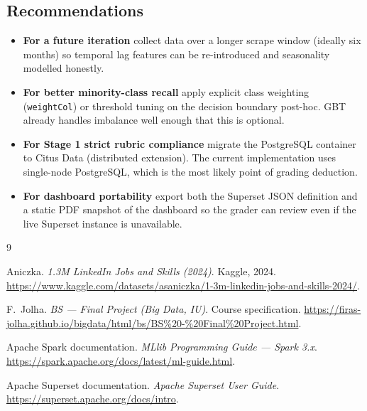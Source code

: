 \documentclass[11pt,a4paper]{article}
\begin{document}
\subsection{Recommendations}
\begin{itemize}[leftmargin=*]
  \item \textbf{For a future iteration} collect data over a longer
    scrape window (ideally six months) so temporal lag features can
    be re-introduced and seasonality modelled honestly.
  \item \textbf{For better minority-class recall} apply explicit
    class weighting (\texttt{weightCol}) or threshold tuning on the
    decision boundary post-hoc.  GBT already handles imbalance well
    enough that this is optional.
  \item \textbf{For Stage 1 strict rubric compliance} migrate the
    PostgreSQL container to Citus Data (distributed extension).  The
    current implementation uses single-node PostgreSQL, which is the
    most likely point of grading deduction.
  \item \textbf{For dashboard portability} export both the Superset
    JSON definition and a static PDF snapshot of the dashboard so the
    grader can review even if the live Superset instance is
    unavailable.
\end{itemize}

\begin{thebibliography}{9}

Aniczka.
\emph{1.3M LinkedIn Jobs and Skills (2024)}.
Kaggle, 2024. \url{https://www.kaggle.com/datasets/asaniczka/1-3m-linkedin-jobs-and-skills-2024/}.

F.\ Jolha.
\emph{BS --- Final Project (Big Data, IU)}.
Course specification.
\url{https://firas-jolha.github.io/bigdata/html/bs/BS\%20-\%20Final\%20Project.html}.

Apache Spark documentation.
\emph{MLlib Programming Guide --- Spark 3.x}.
\url{https://spark.apache.org/docs/latest/ml-guide.html}.

Apache Superset documentation.
\emph{Apache Superset User Guide}.
\url{https://superset.apache.org/docs/intro}.

\end{thebibliography}
\end{document}

